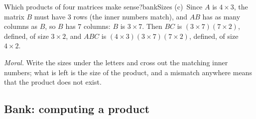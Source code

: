 \documentclass[11pt]{article}
\begin{document}
\begin{exmp}{Which products of four matrices make sense?}{bankSizes}
(c)~Since $A$ is $4\times3$, the matrix $B$ must have $3$ rows (the inner numbers match), and $AB$ has as many columns as $B$, so $B$ has $7$ columns: $B$ is $3\times7$. Then $BC$ is $(3\times7)(7\times2)$, defined, of size $3\times2$, and $ABC$ is $(4\times3)(3\times7)(7\times2)$, defined, of size $4\times2$.

\emph{Moral.} Write the sizes under the letters and cross out the matching inner numbers; what is left is the size of the product, and a mismatch anywhere means that the product does not exist.
\end{exmp}

\subsection*{Bank: computing a product}
\end{document}
